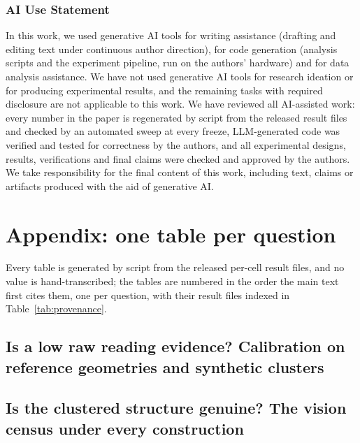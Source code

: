 \documentclass{article}
\theoremstyle{definition}
\begin{document}
\subsubsection*{AI Use Statement}
In this work, we used generative AI tools for writing assistance (drafting and editing text under continuous author direction), for code generation (analysis scripts and the experiment pipeline, run on the authors' hardware) and for data analysis assistance. We have not used generative AI tools for research ideation or for producing experimental results, and the remaining tasks with required disclosure are not applicable to this work. We have reviewed all AI-assisted work: every number in the paper is regenerated by script from the released result files and checked by an automated sweep at every freeze, LLM-generated code was verified and tested for correctness by the authors, and all experimental designs, results, verifications and final claims were checked and approved by the authors. We take responsibility for the final content of this work, including text, claims or artifacts produced with the aid of generative AI.

\FloatBarrier



\clearpage
\appendix
\raggedbottom
\section{Appendix: one table per question}
\label{app:tables}
Every table is generated by script from the released per-cell result files, and no value is hand-transcribed; the tables are numbered in the order the main text first cites them, one per question, with their result files indexed in Table~\ref{tab:provenance}.

\FloatBarrier
\subsection{Is a low raw reading evidence? Calibration on reference geometries and synthetic clusters}
\label{app:calibration}
\label{app:star}


\FloatBarrier
\subsection{Is the clustered structure genuine? The vision census under every construction}
\label{app:census}
\label{app:nulls}
\end{document}
